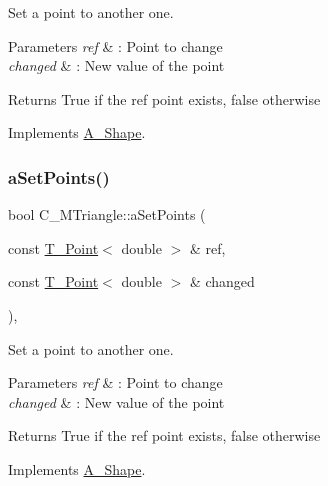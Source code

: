 Set a point to another one. 


\begin{DoxyParams}{Parameters}
{\em ref} & \+: Point to change \\
\hline
{\em changed} & \+: New value of the point \\
\hline
\end{DoxyParams}
\begin{DoxyReturn}{Returns}
True if the ref point exists, false otherwise 
\end{DoxyReturn}


Implements \hyperlink{classA__Shape_a6996f454b337f8425ad13cba3f7a7c35}{A\+\_\+\+Shape}.

\mbox{\label{classC__MTriangle_a5a3971eb0aafc16e5a34bd94130d7c6b}} 
\subsubsection{\texorpdfstring{a\+Set\+Points()}{aSetPoints()}\hspace{0.1cm}{\footnotesize\ttfamily [2/2]}}
{\footnotesize\ttfamily bool C\+\_\+\+M\+Triangle\+::a\+Set\+Points (\begin{DoxyParamCaption}\item[{const \hyperlink{classT__Point}{T\+\_\+\+Point}$<$ double $>$ \&}]{ref,  }\item[{const \hyperlink{classT__Point}{T\+\_\+\+Point}$<$ double $>$ \&}]{changed }\end{DoxyParamCaption})\hspace{0.3cm}{\ttfamily [override]}, {\ttfamily [virtual]}}



Set a point to another one. 


\begin{DoxyParams}{Parameters}
{\em ref} & \+: Point to change \\
\hline
{\em changed} & \+: New value of the point \\
\hline
\end{DoxyParams}
\begin{DoxyReturn}{Returns}
True if the ref point exists, false otherwise 
\end{DoxyReturn}


Implements \hyperlink{classA__Shape_a6996f454b337f8425ad13cba3f7a7c35}{A\+\_\+\+Shape}.

